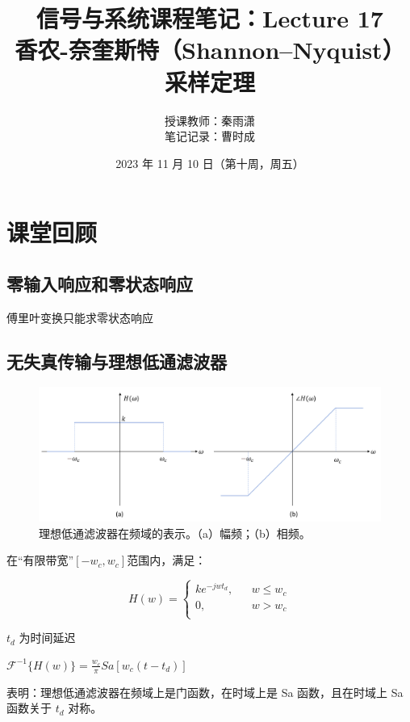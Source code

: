 \documentclass[UTF8]{ctexart}
\begin{document}
\title{信号与系统课程笔记：Lecture 17 \\
香农-奈奎斯特（Shannon–Nyquist）采样定理}
\author{授课教师：秦雨潇 \\
        笔记记录：曹时成}
\date{2023 年 11 月 10 日（第十周，周五）}
\maketitle

\section{课堂回顾}

\subsection{零输入响应和零状态响应}
傅里叶变换只能求零状态响应 \par
\subsection{无失真传输与理想低通滤波器}
\begin{figure}[h]
    \centering         %
    \includegraphics[scale=0.32]{1.png}
    \caption{理想低通滤波器在频域的表示。（a）幅频；（b）相频。}
\end{figure}
在“有限带宽”$[-w_c,w_c] $范围内，满足： \par
\[  H(w) =\left\{ \begin{array}{rcl}
    ke^{-jwt_d}, & & {w\leqslant w_c}\\
    0, & & {{w> w_c}}\\
    \end{array} \right. \] \par
$t_d$ 为时间延迟 \par
$ \mathscr{F}^{-1}\{ H(w)\} =\frac{w_c}{\pi}Sa[w_c (t-t_d)]  $ \par
表明：理想低通滤波器在频域上是门函数，在时域上是 Sa 函数，且在时域上 Sa 函数关于 $t_d$ 对称。
\end{document}
